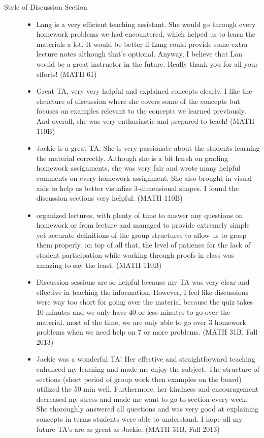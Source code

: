 \documentclass[11pt]{article}
\theoremstyle{plain} \numberwithin{equation}{section}
\theoremstyle{definition}
\begin{document}
{\begin{description}
    \item[\normalsize{Style of Discussion Section}] 
    	\begin{itemize}
		\item Lang is a very efficient teaching assistant.  She would go through every homework problems we had encountered, which helped us to learn the materials a lot.  It would be better if Lang could provide some extra lecture notes although that's optional.  Anyway, I believe that Lan would be a great instructor in the future.  Really thank you for all your efforts! (MATH 61)
		\item Great TA, very very helpful and explained concepts clearly.  I like the structure of discussion where she covers some of the concepts but focuses on examples relevant to the concepts we learned previously.  And overall, she was very enthusiastic and prepared to teach! (MATH 110B)
		\item Jackie is a great TA.  She is very passionate about the students learning the material correctly.  Although she is a bit harsh on grading homework assignments, she was very fair and wrote many helpful comments on every homework assignment.  She also brought in visual aids to help us better visualize $3$-dimensional shapes.  I found the discussion sections very helpful. (MATH 110B)
		\item organized lectures, with plenty of time to answer any questions on homework or from lecture and managed to provide extremely simple yet accurate definitions of the group structures to allow us to grasp them properly. on top of all that, the level of patience for the lack of student participation while working through proofs in class was amazing to say the least. (MATH 110B)
		\item Discussion sessions are so helpful because my TA was very clear and effective in teaching the information.  However, I feel like discussions were way too short for going over the material because the quiz takes 10 minutes and we only have 40 or less minutes to go over the material.  most of the time, we are only able to go over 3 homework problems when we need help on 7 or more problems. (MATH 31B, Fall 2013)
		\item Jackie was a wonderful TA!  Her effective and straightforward teaching enhanced my learning and made me enjoy the subject.  The structure of sections (short period of group work then examples on the board) utilized the 50 min well.  Furthermore, her kindness and encouragement decreased my stress and made me want to go to section every week.  She thoroughly answered all questions and was very good at explaining concepts in terms students were able to understand.  I hope all my future TA's are as great as Jackie. (MATH 31B, Fall 2013)

\end{itemize}
\end{description}}
\end{document}

